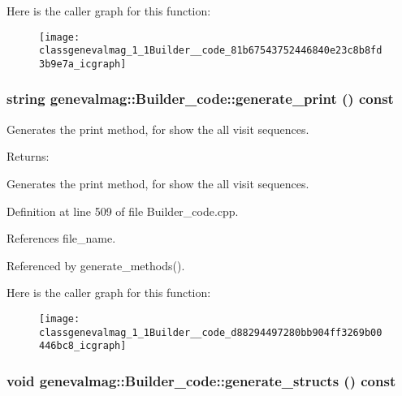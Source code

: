 Here is the caller graph for this function:\nopagebreak
\begin{figure}[H]
\begin{center}
\leavevmode
\texttt{[image: classgenevalmag\_1\_1Builder\_\_code\_81b67543752446840e23c8b8fd3b9e7a\_icgraph]}
\end{center}
\end{figure}
\hypertarget{classgenevalmag_1_1Builder__code_d88294497280bb904ff3269b00446bc8}{
\subsubsection[{generate\_\-print}]{\setlength{\rightskip}{0pt plus 5cm}string genevalmag::Builder\_\-code::generate\_\-print () const}}
\label{classgenevalmag_1_1Builder__code_d88294497280bb904ff3269b00446bc8}


Generates the print method, for show the all visit sequences. \begin{Desc}
\item[Returns:]\end{Desc}
Generates the print method, for show the all visit sequences. 

Definition at line 509 of file Builder\_\-code.cpp.

References file\_\-name.

Referenced by generate\_\-methods().

Here is the caller graph for this function:\nopagebreak
\begin{figure}[H]
\begin{center}
\leavevmode
\texttt{[image: classgenevalmag\_1\_1Builder\_\_code\_d88294497280bb904ff3269b00446bc8\_icgraph]}
\end{center}
\end{figure}
\hypertarget{classgenevalmag_1_1Builder__code_5dcd144389b5612a328fede4317d414f}{
\subsubsection[{generate\_\-structs}]{\setlength{\rightskip}{0pt plus 5cm}void genevalmag::Builder\_\-code::generate\_\-structs () const}}
\label{classgenevalmag_1_1Builder__code_5dcd144389b5612a328fede4317d414f}


